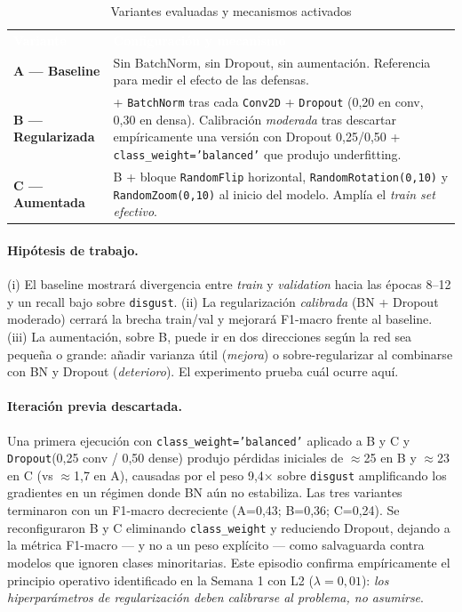 \documentclass[10pt,a4paper,twocolumn]{article}
\begin{document}
\begin{table}[H]
\centering
\caption{Variantes evaluadas y mecanismos activados}
\label{tab:variantes}
\small
\renewcommand{\arraystretch}{1.2}
\begin{tabularx}{\columnwidth}{>{\bfseries}l X}
\rowcolor{tableheader}\textcolor{white}{\textbf{Variante}} & \textcolor{white}{\textbf{Configuración y mecanismo}}\\
A --- Baseline    & Sin BatchNorm, sin Dropout, sin aumentación. Referencia para medir el efecto de las defensas.\\
B --- Regularizada & + \texttt{BatchNorm} tras cada \texttt{Conv2D} + \texttt{Dropout} (0,20 en conv, 0,30 en densa). Calibración \textit{moderada} tras descartar empíricamente una versión con Dropout 0,25/0,50 + \texttt{class\_weight='balanced'} que produjo underfitting.\\
C --- Aumentada   & B + bloque \texttt{RandomFlip} horizontal, \texttt{RandomRotation(0,10)} y \texttt{RandomZoom(0,10)} al inicio del modelo. Amplía el \textit{train set efectivo}.\\
\end{tabularx}
\end{table}

\paragraph{Hipótesis de trabajo.}
(i) El baseline mostrará divergencia entre \textit{train} y \textit{validation} hacia las épocas 8--12 y un recall bajo sobre \texttt{disgust}.
(ii) La regularización \textit{calibrada} (BN + Dropout moderado) cerrará la brecha train/val y mejorará F1-macro frente al baseline.
(iii) La aumentación, sobre B, puede ir en dos direcciones según la red sea pequeña o grande: añadir varianza útil (\textit{mejora}) o sobre-regularizar al combinarse con BN y Dropout (\textit{deterioro}). El experimento prueba cuál ocurre aquí.

\paragraph{Iteración previa descartada.} Una primera ejecución con \texttt{class\_weight='balanced'} aplicado a B y C y \texttt{Dropout}(0,25 conv / 0,50 dense) produjo pérdidas iniciales de $\approx$25 en B y $\approx$23 en C (vs $\approx$1,7 en A), causadas por el peso 9,4$\times$ sobre \texttt{disgust} amplificando los gradientes en un régimen donde BN aún no estabiliza. Las tres variantes terminaron con un F1-macro decreciente (A=0,43; B=0,36; C=0,24). Se reconfiguraron B y C eliminando \texttt{class\_weight} y reduciendo Dropout, dejando a la métrica F1-macro --- y no a un peso explícito --- como salvaguarda contra modelos que ignoren clases minoritarias. Este episodio confirma empíricamente el principio operativo identificado en la Semana 1 con L2 ($\lambda=0,01$): \textit{los hiperparámetros de regularización deben calibrarse al problema, no asumirse}.
\end{document}
